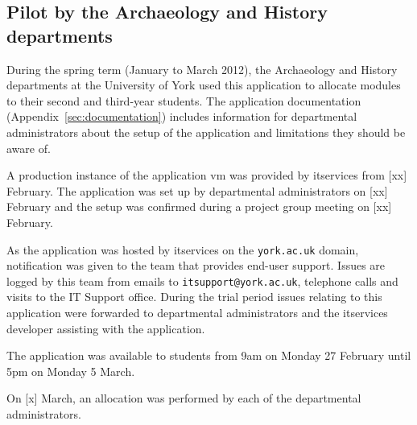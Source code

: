 
\subsection{Pilot by the Archaeology and History departments}

During the spring term (January to March 2012), the Archaeology and History
departments at the University of York used this application to allocate
modules to their second and third-year students. The application documentation
(Appendix~\ref{sec:documentation}) includes information for departmental
administrators about the setup of the application and limitations they should
be aware of.

A production instance of the application \gls{vm} was provided by
\gls{itservices} from [xx] February. The application was set up by
departmental administrators on [xx] February and the setup was confirmed
during a project group meeting on [xx] February.

As the application was hosted by \gls{itservices} on the \texttt{york.ac.uk}
domain, notification was given to the team that provides end-user support.
Issues are logged by this team from emails to \texttt{itsupport@york.ac.uk},
telephone calls and visits to the IT Support office. During the trial period
issues relating to this application were forwarded to departmental
administrators and the \gls{itservices} developer assisting with the
application.

The application was available to students from 9am on Monday 27 February until
5pm on Monday 5 March.


On [x] March, an allocation was performed by each of the departmental
administrators.

